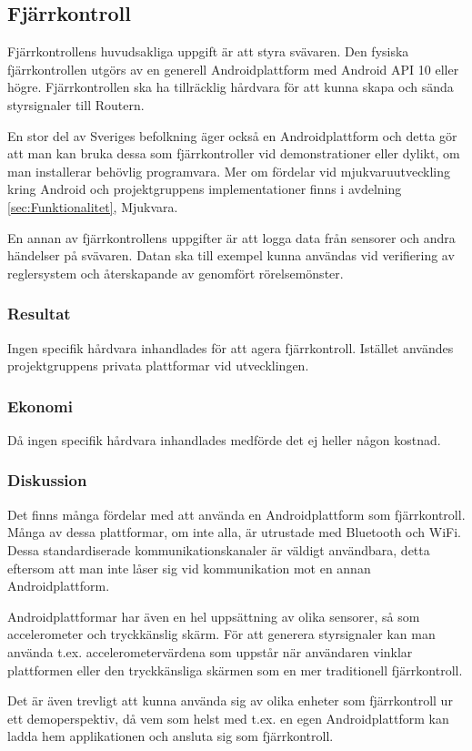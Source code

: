 \subsection{Fjärrkontroll}
\label{subsec:system/fjarrkontroll}
Fjärrkontrollens huvudsakliga uppgift är att styra svävaren. Den fysiska
fjärrkontrollen utgörs av en generell Androidplattform med Android API 10 eller
högre. Fjärrkontrollen ska ha tillräcklig hårdvara för att kunna skapa
och sända styrsignaler till Routern.

En stor del av Sveriges befolkning äger också en Androidplattform och detta gör
att man kan bruka dessa som fjärrkontroller vid demonstrationer eller dylikt, om
man installerar behövlig programvara. Mer om fördelar vid mjukvaruutveckling kring
Android och projektgruppens implementationer finns i avdelning
\ref{sec:Funktionalitet}, Mjukvara.

En annan av fjärrkontrollens uppgifter är att logga data från sensorer och andra
händelser på svävaren. Datan ska till exempel kunna användas vid verifiering av
reglersystem och återskapande av genomfört rörelsemönster.

\subsubsection{Resultat}
Ingen specifik hårdvara inhandlades för att agera fjärrkontroll. Istället
användes projektgruppens privata plattformar vid utvecklingen.

\subsubsection{Ekonomi}
Då ingen specifik hårdvara inhandlades medförde det ej heller någon kostnad.

\subsubsection{Diskussion}
Det finns många fördelar med att använda en Androidplattform som fjärrkontroll.
Många av dessa plattformar, om inte alla, är utrustade med Bluetooth och
WiFi. Dessa standardiserade kommunikationskanaler är väldigt användbara,
detta eftersom att man inte låser sig vid kommunikation mot en annan
Androidplattform.

Androidplattformar har även en hel uppsättning av olika sensorer, så som
accelerometer och tryckkänslig skärm. För att generera styrsignaler kan man
använda t.ex. accelerometervärdena som uppstår när användaren vinklar
plattformen eller den tryckkänsliga skärmen som en mer traditionell fjärrkontroll.

Det är även trevligt att kunna använda sig av olika enheter som fjärrkontroll ur
ett demoperspektiv, då vem som helst med t.ex. en egen Androidplattform kan
ladda hem applikationen och ansluta sig som fjärrkontroll.
